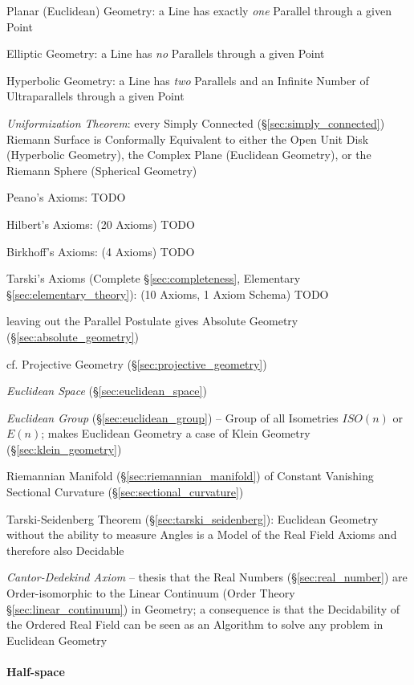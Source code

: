 Planar (Euclidean) Geometry: a Line has exactly \emph{one} Parallel through a
given Point

\fist Elliptic Geometry: a Line has \emph{no} Parallels through a given Point

\fist Hyperbolic Geometry: a Line has \emph{two} Parallels and an Infinite
Number of Ultraparallels through a given Point

\emph{Uniformization Theorem}: every Simply Connected
(\S\ref{sec:simply_connected}) Riemann Surface is Conformally Equivalent to
either the Open Unit Disk (Hyperbolic Geometry), the Complex Plane (Euclidean
Geometry), or the Riemann Sphere (Spherical Geometry)

Peano's Axioms: TODO

Hilbert's Axioms: (20 Axioms) TODO

Birkhoff's Axioms: (4 Axioms) TODO

Tarski's Axioms (Complete \S\ref{sec:completeness}, Elementary
\S\ref{sec:elementary_theory}): (10 Axioms, 1 Axiom Schema) TODO

\fist leaving out the Parallel Postulate gives Absolute Geometry
(\S\ref{sec:absolute_geometry})

cf. Projective Geometry (\S\ref{sec:projective_geometry})

\emph{Euclidean Space} (\S\ref{sec:euclidean_space})

\emph{Euclidean Group} (\S\ref{sec:euclidean_group}) -- Group of all
Isometries $ISO(n)$ or $E(n)$; makes Euclidean Geometry a case of
Klein Geometry (\S\ref{sec:klein_geometry})

Riemannian Manifold (\S\ref{sec:riemannian_manifold}) of Constant Vanishing
Sectional Curvature (\S\ref{sec:sectional_curvature})

Tarski-Seidenberg Theorem (\S\ref{sec:tarski_seidenberg}): Euclidean Geometry
without the ability to measure Angles is a Model of the Real Field Axioms
and therefore also Decidable

\emph{Cantor-Dedekind Axiom} -- thesis that the Real Numbers
(\S\ref{sec:real_number}) are Order-isomorphic to the Linear Continuum (Order
Theory \S\ref{sec:linear_continuum}) in Geometry; a consequence is that the
Decidability of the Ordered Real Field can be seen as an Algorithm to solve any
problem in Euclidean Geometry



\paragraph{Half-space}\label{sec:half_space}\hfill

